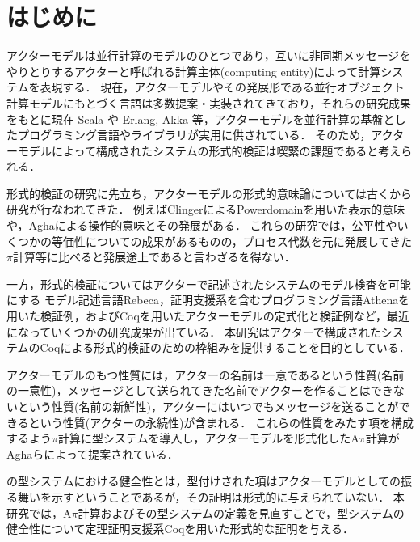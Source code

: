 \section{はじめに}

アクターモデル\cite{Agha:1986aa}は並行計算のモデルのひとつであり，互いに非同期メッセージをやりとりするアクターと呼ばれる計算主体(computing entity)によって計算システムを表現する．
現在，アクターモデルやその発展形である並行オブジェクト計算モデル\cite{Yonezawa:1986aa}にもとづく言語は多数提案・実装されてきており，それらの研究成果をもとに現在 Scala や Erlang, Akka 等，アクターモデルを並行計算の基盤としたプログラミング言語やライブラリが実用に供されている．
そのため，アクターモデルによって構成されたシステムの形式的検証は喫緊の課題であると考えられる．

形式的検証の研究に先立ち，アクターモデルの形式的意味論については古くから研究が行なわれてきた．
例えばClingerによるPowerdomainを用いた表示的意味\cite{Clinger:1981aa}や，Aghaによる操作的意味\cite{Agha:1986aa}とその発展\cite{Agha:1997aa}がある．
これらの研究では，公平性やいくつかの等価性についての成果があるものの，プロセス代数を元に発展してきた$\pi$計算等に比べると発展途上であると言わざるを得ない．

一方，形式的検証についてはアクターで記述されたシステムのモデル検査を可能にする
モデル記述言語Rebeca\cite{Sirjani:2011aa}，証明支援系を含むプログラミング言語Athenaを用いた検証例\cite{Musser:2013aa}，およびCoqを用いたアクターモデルの定式化と検証例\cite{Garnock-Jones:2014aa}など，最近になっていくつかの研究成果が出ている．
本研究はアクターで構成されたシステムのCoqによる形式的検証のための枠組みを提供することを目的としている．

アクターモデルのもつ性質には，アクターの名前は一意であるという性質(名前の一意性)，メッセージとして送られてきた名前でアクターを作ることはできないという性質(名前の新鮮性)，アクターにはいつでもメッセージを送ることができるという性質(アクターの永続性)が含まれる．
これらの性質をみたす項を構成するよう\(\pi\)計算に型システムを導入し，アクターモデルを形式化したA\(\pi\)計算がAghaらによって提案されている\cite{Agha:2004aa}．

\api の型システムにおける健全性とは，型付けされた項はアクターモデルとしての振る舞いを示すということであるが，その証明は形式的に与えられていない．
本研究では，A\(\pi\)計算およびその型システムの定義を見直すことで，型システムの健全性について定理証明支援系Coqを用いた形式的な証明を与える．


